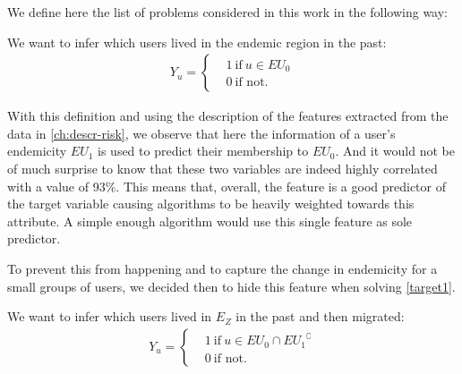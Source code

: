 We define here the list of problems considered in this work in the following way:


\begin{problem}\label{target1}
We want to infer which users lived in the endemic region in the past:
		\begin{align*}
		Y_u =
		\begin{cases}
		&1 \ \mbox{if} \ u \in EU_{0} \\
		&0 \ \mbox{if not}.
		\end{cases}
		\end{align*}
\end{problem}

With this definition and using the description of the features extracted from the data in \cref{ch:descr-risk}, we observe that here the information of a user's endemicity $EU_{1}$ is used to predict their membership to $EU_{0}$.
And it would not be of much surprise to know that these two variables are indeed highly correlated with a value of 93\%.
This means that, overall, the feature is a good predictor of the target variable causing algorithms to be heavily weighted towards this attribute.
A simple enough algorithm would use this single feature as sole predictor.

To prevent this from happening and to capture the change in endemicity for a small groups of users, we decided then to hide this feature when solving \cref{target1}.



\begin{problem}\label{target2}
We want to infer which users lived in $E_Z$ in the past and then migrated:
	\begin{align*}
				Y_u =
				\begin{cases}
					&1 \ \mbox{if} \ u \in EU_{0} \cap { EU_{1} }^{\complement}  \\
					&0 \ \mbox{if not}.
				\end{cases}
			\end{align*}
\end{problem}

